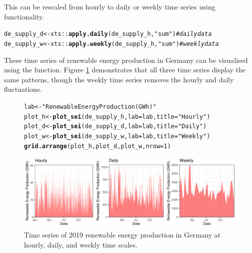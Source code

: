 \documentclass[article,shortnames,nojss]{jss}\usepackage[]{graphicx}\usepackage[]{xcolor}
\makeatletter
\newcommand{\hlnum}[1]{\textcolor[rgb]{0.686,0.059,0.569}{#1}}%
\newcommand{\hlstr}[1]{\textcolor[rgb]{0.192,0.494,0.8}{#1}}%
\newcommand{\hlcom}[1]{\textcolor[rgb]{0.678,0.584,0.686}{\textit{#1}}}%
\newcommand{\hlopt}[1]{\textcolor[rgb]{0,0,0}{#1}}%
\newcommand{\hlstd}[1]{\textcolor[rgb]{0.345,0.345,0.345}{#1}}%
\newcommand{\hlkwb}[1]{\textcolor[rgb]{0.69,0.353,0.396}{#1}}%
\newcommand{\hlkwc}[1]{\textcolor[rgb]{0.333,0.667,0.333}{#1}}%
\newcommand{\hlkwd}[1]{\textcolor[rgb]{0.737,0.353,0.396}{\textbf{#1}}}%
\newenvironment{kframe}{%
 \def\at@end@of@kframe{}%
 \ifinner\ifhmode%
  \def\at@end@of@kframe{\end{minipage}}%
  \begin{minipage}{\columnwidth}%
 \fi\fi%
 \def\FrameCommand##1{\hskip\@totalleftmargin \hskip-\fboxsep
 \colorbox{shadecolor}{##1}\hskip-\fboxsep
     \hskip-\linewidth \hskip-\@totalleftmargin \hskip\columnwidth}%
 \MakeFramed {\advance\hsize-\width
   \@totalleftmargin\z@ \linewidth\hsize
   \@setminipage}}%
 {\par\unskip\endMakeFramed%
 \at@end@of@kframe}
\newenvironment{knitrout}{}{} %
\makeatother
\begin{document}
This can be rescaled from hourly to daily or weekly time series using  functionality.

\begin{knitrout}
\color{fgcolor}\begin{kframe}
\begin{alltt}
\hlstd{de_supply_d} \hlkwb{<-} \hlstd{xts}\hlopt{::}\hlkwd{apply.daily}\hlstd{(de_supply_h,} \hlstr{"sum"}\hlstd{)}    \hlcom{# daily data}
\hlstd{de_supply_w} \hlkwb{<-} \hlstd{xts}\hlopt{::}\hlkwd{apply.weekly}\hlstd{(de_supply_h,} \hlstr{"sum"}\hlstd{)}   \hlcom{# weekly data}
\end{alltt}
\end{kframe}
\end{knitrout}

These time series of renewable energy production in Germany can be visualised using the  function. Figure \ref{fig:ts_raw} demonstrates that all three time series display the same patterns, though the weekly time series removes the hourly and daily fluctuations.

\begin{figure}
\begin{knitrout}
\color{fgcolor}\begin{kframe}
\begin{alltt}
\hlstd{lab} \hlkwb{<-} \hlstr{"Renewable Energy Production (GWh)"}
\hlstd{plot_h} \hlkwb{<-} \hlkwd{plot_sei}\hlstd{(de_supply_h,} \hlkwc{lab} \hlstd{= lab,} \hlkwc{title} \hlstd{=} \hlstr{"Hourly"}\hlstd{)}
\hlstd{plot_d} \hlkwb{<-} \hlkwd{plot_sei}\hlstd{(de_supply_d,} \hlkwc{lab} \hlstd{= lab,} \hlkwc{title} \hlstd{=} \hlstr{"Daily"}\hlstd{)}
\hlstd{plot_w} \hlkwb{<-} \hlkwd{plot_sei}\hlstd{(de_supply_w,} \hlkwc{lab} \hlstd{= lab,} \hlkwc{title} \hlstd{=} \hlstr{"Weekly"}\hlstd{)}
\hlkwd{grid.arrange}\hlstd{(plot_h, plot_d, plot_w,} \hlkwc{nrow} \hlstd{=} \hlnum{1}\hlstd{)}
\end{alltt}
\end{kframe}

{\centering \includegraphics[width=\linewidth]{figure/plot_raw_ts-1} 

}


\end{knitrout}
\caption{Time series of 2019 renewable energy production in Germany at hourly, daily, and weekly time scales.}
\label{fig:ts_raw}
\end{figure}
\end{document}
